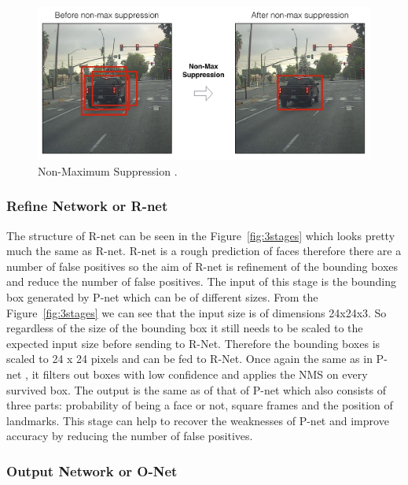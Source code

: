 \begin{figure}[!htb]
    \centering
    \includegraphics[width=1\textwidth]{figures/non-max.png}
    \caption{ Non-Maximum Suppression \cite{boxescar}.}
    \label{fig:non-max}
\end{figure}
\subsubsection{Refine Network or R-net}

The structure of R-net can be seen in the Figure~\ref{fig:3stages} which looks pretty much the same as R-net. R-net is a rough prediction of faces therefore there are a number of false positives so the aim of R-net is refinement of the bounding boxes and reduce the number of false positives.
The input of this stage is the bounding box generated by P-net which can be of different sizes. From the Figure~\ref{fig:3stages} we can see that the input size is of dimensions 24x24x3. So regardless of the size of the bounding box it still needs to be scaled to the expected input size before sending to R-Net. Therefore the bounding boxes is scaled to 24 x 24 pixels and can be fed to R-Net. Once again the same as in P-net , it filters out boxes with low confidence and applies the NMS on every survived box. The output is the same as of that of P-net which also consists of three parts: probability of being a face or not, square frames and the position of landmarks. This stage can help to recover the weaknesses of P-net and improve accuracy by reducing the number of false positives. 


\subsubsection{Output Network or O-Net}

